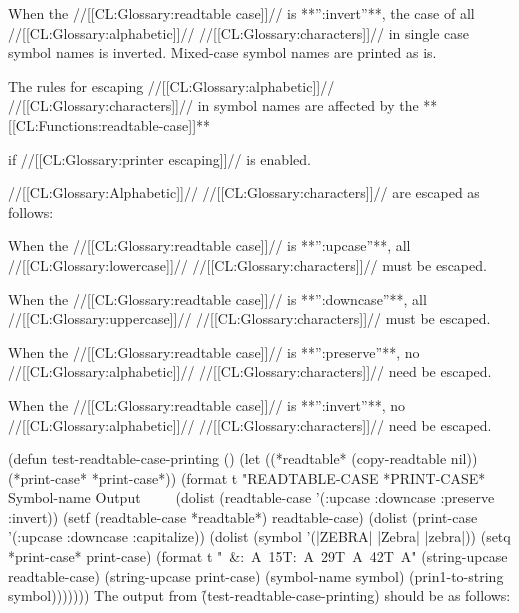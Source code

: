 
 When the //[[CL:Glossary:readtable case]]// is **'':invert''**,
 the case of all //[[CL:Glossary:alphabetic]]// //[[CL:Glossary:characters]]// 
 in single case symbol names is inverted.
 Mixed-case symbol names are printed as is.
\endlist 

The rules for escaping //[[CL:Glossary:alphabetic]]// //[[CL:Glossary:characters]]// in symbol names are affected by
the **[[CL:Functions:readtable-case]]** 

if //[[CL:Glossary:printer escaping]]// is enabled.

//[[CL:Glossary:Alphabetic]]// //[[CL:Glossary:characters]]// are escaped as follows:                
\beginlist
{}

When the //[[CL:Glossary:readtable case]]// is **'':upcase''**,
all //[[CL:Glossary:lowercase]]// //[[CL:Glossary:characters]]// must be escaped.


When the //[[CL:Glossary:readtable case]]// is **'':downcase''**,
all //[[CL:Glossary:uppercase]]// //[[CL:Glossary:characters]]// must be escaped.


When the //[[CL:Glossary:readtable case]]// is **'':preserve''**, 
no //[[CL:Glossary:alphabetic]]// //[[CL:Glossary:characters]]// need be escaped.


When the //[[CL:Glossary:readtable case]]// is **'':invert''**,
no //[[CL:Glossary:alphabetic]]// //[[CL:Glossary:characters]]// need be escaped.

\endlist    


\code
 (defun test-readtable-case-printing ()
   (let ((*readtable* (copy-readtable nil))
         (*print-case* *print-case*))
     (format t "READTABLE-CASE *PRINT-CASE*  Symbol-name  Output~
              ~%
              ~%
     (dolist (readtable-case '(:upcase :downcase :preserve :invert))
       (setf (readtable-case *readtable*) readtable-case)
       (dolist (print-case '(:upcase :downcase :capitalize))
         (dolist (symbol '(|ZEBRA| |Zebra| |zebra|))
           (setq *print-case* print-case)
           (format t "~&:~A~15T:~A~29T~A~42T~A"
                   (string-upcase readtable-case)
                   (string-upcase print-case)
                   (symbol-name symbol)
                   (prin1-to-string symbol)))))))
\endcode
  The output from \f{(test-readtable-case-printing)} should be as follows:

